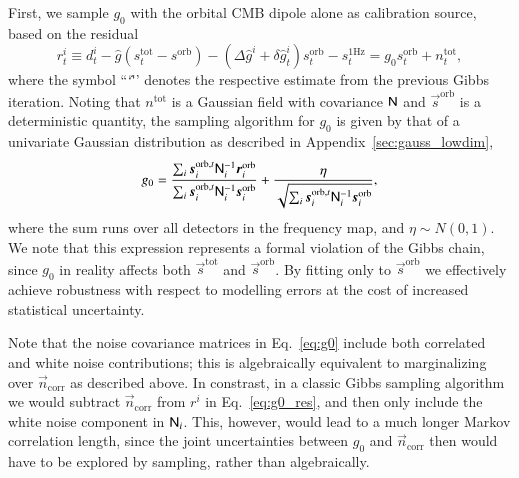 \documentclass[twocolumn]{aa}
\newcommand{\n}[0]{\vec{n}}
\newcommand{\s}[0]{\vec{s}}
\newcommand{\N}[0]{\tens{N}}
\renewcommand{\r}[0]{\vec{r}}
\begin{document}
First, we sample $g_0$ with the orbital CMB dipole alone as
calibration source, based on the residual
\begin{equation}
  r^i_t \equiv d^i_{t} - \hat{g} (s^{\mathrm{tot}}_{t} -
  s^{\mathrm{orb}}) - (\Delta \hat{g}^i + \delta \hat{g}_t^i) s^{\mathrm{orb}}_{t} - s^{\mathrm{1Hz}}_t
 =  g_0 s^{\mathrm{orb}}_{t} + n^{\mathrm{tot}}_{t},
\end{equation}
where the symbol ``\char`\^'' denotes the respective estimate from the
previous Gibbs iteration. Noting that $n^{\mathrm{tot}}$ is a Gaussian
field with covariance $\N$ and $\s^{\mathrm{orb}}$ is a deterministic
quantity, the sampling algorithm for $g_0$ is given by that of a
univariate Gaussian distribution as described in
Appendix~\ref{sec:gauss_lowdim},
\begin{equation}
  g_0 =
  \frac{\sum_i\s_i^{\mathrm{orb},t}\N_i^{-1}\r_i^{\mathrm{orb}}}{\sum_i\s_i^{\mathrm{orb},t}\N_i^{-1}\s_i^{\mathrm{orb}}}
  +
  \frac{\eta}{\sqrt{\sum_i\s_i^{\mathrm{orb},t}\N_i^{-1}\s_i^{\mathrm{orb}}}},
  \label{eq:g0}
\end{equation}
where the sum runs over all detectors in the frequency map, and $\eta
\sim N(0,1)$.  We note that this expression represents a formal
violation of the Gibbs chain, since $g_0$ in reality affects both
$\s^{\mathrm{tot}}$ and $\s^{\mathrm{orb}}$. By fitting only to
$\s^{\mathrm{orb}}$ we effectively achieve robustness with respect to
modelling errors at the cost of increased statistical
uncertainty.

Note that the noise covariance matrices in Eq.~\eqref{eq:g0} include
both correlated and white noise contributions; this is algebraically
equivalent to marginalizing over $\n_{\mathrm{corr}}$ as described
above. In constrast, in a classic Gibbs sampling algorithm we would
subtract $\n_{\mathrm{corr}}$ from $r^i$ in Eq.~\eqref{eq:g0_res}, and
then only include the white noise component in $\N_i$. This, however,
would lead to a much longer Markov correlation length, since the joint
uncertainties between $g_0$ and $\n_{\mathrm{corr}}$ then would have
to be explored by sampling, rather than algebraically.
\end{document}
